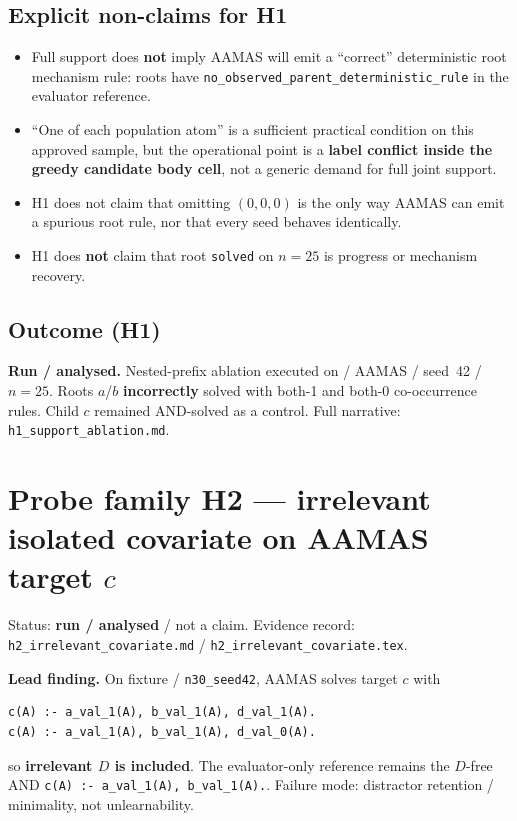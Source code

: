 \documentclass[11pt]{article}
\begin{document}
\subsection{Explicit non-claims for H1}

\begin{itemize}
  \item Full support does \textbf{not} imply AAMAS will emit a ``correct''
    deterministic root mechanism rule: roots have
    \texttt{no\_observed\_parent\_deterministic\_rule} in the evaluator
    reference.
  \item ``One of each population atom'' is a sufficient practical condition on
    this approved sample, but the operational point is a \textbf{label conflict
    inside the greedy candidate body cell}, not a generic demand for full joint
    support.
  \item H1 does not claim that omitting \((0,0,0)\) is the only way AAMAS can
    emit a spurious root rule, nor that every seed behaves identically.
  \item H1 does \textbf{not} claim that root \texttt{solved} on \(n{=}25\) is
    progress or mechanism recovery.
\end{itemize}

\subsection{Outcome (H1)}

\textbf{Run / analysed.}
Nested-prefix ablation executed on
 / AAMAS / seed~42 / \(n{=}25\).
Roots \(a\)/\(b\) \textbf{incorrectly} solved with both-1 and both-0
co-occurrence rules.
Child \(c\) remained AND-solved as a control.
Full narrative: \texttt{h1\_support\_ablation.md}.

\section{Probe family H2 --- irrelevant isolated covariate on AAMAS target \texorpdfstring{\(c\)}{c}}

Status: \textbf{run / analysed} / not a claim.
Evidence record: \texttt{h2\_irrelevant\_covariate.md} /
\texttt{h2\_irrelevant\_covariate.tex}.

\textbf{Lead finding.}
On fixture  / \texttt{n30\_seed42},
AAMAS solves target \(c\) with
\begin{verbatim}
c(A) :- a_val_1(A), b_val_1(A), d_val_1(A).
c(A) :- a_val_1(A), b_val_1(A), d_val_0(A).
\end{verbatim}
so \textbf{irrelevant \(D\) is included}.
The evaluator-only reference remains the \(D\)-free AND
\texttt{c(A) :- a\_val\_1(A), b\_val\_1(A).}.
Failure mode: distractor retention / minimality, not unlearnability.
\end{document}
